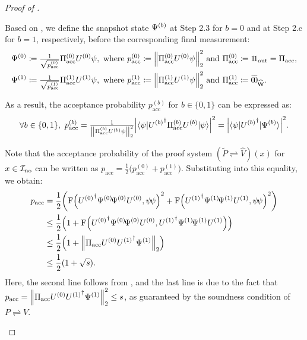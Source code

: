 \documentclass[11pt, a4paper]{article}
\numberwithin{equation}{section}
\numberwithin{figure}{section}
\newcommand{\protocol}[2]{{#1}\!\rightleftharpoons\!{#2}}
\DeclarePairedDelimiter\rbra{\lparen}{\rparen}
\DeclarePairedDelimiter\abs{\lvert}{\rvert}
\DeclarePairedDelimiter\norm{\lVert}{\rVert}
\let\ket\relax\DeclarePairedDelimiter\ket{\lvert}{\rangle}
\let\bra\relax\DeclarePairedDelimiter\bra{\langle}{\rvert}
\newcommand{\ketbra}[2]{\ensuremath{\ket{#1}\!\bra{#2}}}
\newcommand{\braket}[3]{\langle #1 | #2 | #3 \rangle}
\newcommand{\F}{\mathrm{F}}
\newcommand{\no}{{\rm no}}
\newcommand{\acc}{\mathrm{acc}}
\newcommand{\pacc}{p_{\mathrm{acc}}}
\newcommand{\binset}{\{0,1\}}
\newcommand{\Out}{\mathrm{out}}
\newcommand{\calI}{\mathcal{I}}
\newcommand{\sfW}{\mathsf{W}}
\begin{document}
\begin{proof}[Proof of ]
\begin{itemize}[leftmargin=1.5em]
        Based on , we define the snapshot state $\ket{\Psi^{(b)}}$ at Step 2.3 for $b=0$ and at Step 2.c for $b=1$, respectively, before the corresponding final measurement:
        \begin{align*}
            &\ket{\Psi^{(0)}} \coloneqq \tfrac{1}{\sqrt{\pacc^{(0)}}} \Pi_\acc^{(0)} U^{(0)} \ket{\psi}, \text{ where } \pacc^{(0)} \coloneqq \norm*{\Pi_\acc^{(0)} U^{(0)} \ket{\psi}}^2_2 \text{ and } \Pi_\acc^{(0)} \coloneqq \ketbra{1}{1}_{\Out} = \Pi_\acc,\\
            &\ket{\Psi^{(1)}} \coloneqq \tfrac{1}{\sqrt{\pacc^{(1)}}} \Pi_\acc^{(1)} U^{(1)} \ket{\psi}, \text{ where } \pacc^{(1)} \coloneqq \norm*{\Pi_\acc^{(1)} U^{(1)} \ket{\psi}}^2_2 \text{ and } \Pi_\acc^{(1)} \coloneqq \ketbra{\bar{0}}{\bar{0}}_{\widehat{\sfW}}.
        \end{align*}

        As a result, the acceptance probability $\pacc^{(b)}$ for $b\in\binset$ can be expressed as: 
        \begin{equation}
            \label{eq:parallelization-pacc}
            \forall b\in\binset,~\pacc^{(b)} = \tfrac{1}{\norm*{\Pi_\acc^{(b)} U^{(b)} \ket{\psi}}^2_2} \abs*{ \braket{\psi}{{U^{(b)}}^{\dagger} \Pi_\acc^{(b)} U^{(b)}}{\psi} }^2
            = \abs*{\braket{\psi}{{U^{(b)}}^{\dagger}}{\Psi^{(b)}}}^2.
        \end{equation}

        Note that the acceptance probability of the proof system $(\protocol{\widetilde{P}}{\widehat{V}})(x)$ for $x \in \calI_{\no}$ can be written as $\pacc = \frac{1}{2} \big( \pacc^{(0)} + \pacc^{(1)} \big)$. Substituting  into this equality, we obtain:
        \begin{align*}
            \pacc &= \frac{1}{2}\rbra*{\F\rbra*{{U^{(0)}}^{\dagger} \ketbra{\Psi^{(0)}}{\Psi^{(0)}} U^{(0)}, \ketbra{\psi}{\psi}}^2 + \F\rbra*{{U^{(1)}}^{\dagger} \ketbra{\Psi^{(1)}}{\Psi^{(1)}} U^{(1)}, \ketbra{\psi}{\psi}}^2}\\
            &\leq \frac{1}{2} \rbra*{1 + \F\rbra*{{U^{(0)}}^{\dagger} \ketbra{\Psi^{(0)}}{\Psi^{(0)}} U^{(0)}, {U^{(1)}}^{\dagger} \ketbra{\Psi^{(1)}}{\Psi^{(1)}} U^{(1)}}}\\
            &\leq \frac{1}{2} \rbra*{1 + \norm*{\Pi_\acc U^{(0)}{U^{(1)}}^{\dagger}\ket{\Psi^{(1)}}}_2}\\
            &\leq \frac{1}{2} (1+\sqrt{s}).
        \end{align*}
        Here, the second line follows from , and the last line is due to the fact that $\pacc = \norm*{\Pi_\acc U^{(0)}{U^{(1)}}^{\dagger}\ket{\Psi^{(1)}}}^2_2 \leq s$, as guaranteed by the soundness condition of $\protocol{P}{V}$. \qedhere
    \end{itemize}    
\end{proof}
\end{document}
